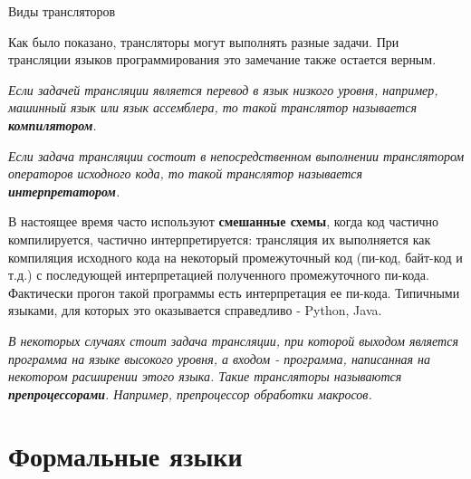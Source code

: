 \documentclass[12pt, pdf, hyperref={unicode},handout]{beamer}
\begin{document}
\begin{frame}{Виды трансляторов}
  \begin{block}

    \small{
      Как было показано, трансляторы могут выполнять разные задачи. При трансляции языков программирования это замечание также остается верным.

      \textit{Если задачей трансляции является перевод в язык низкого уровня, например, машинный язык или язык ассемблера, то такой транслятор называется \textbf{компилятором}.}

      \textit{Если задача трансляции состоит в непосредственном выполнении транслятором операторов исходного кода, то такой транслятор называется \textbf{интерпретатором}.}

      В настоящее время часто используют \textbf{смешанные схемы}, когда код частично компилируется, частично интерпретируется: трансляция их выполняется как компиляция исходного кода на некоторый промежуточный код (пи-код, байт-код и т.д.) с последующей интерпретацией полученного промежуточного пи-кода. Фактически прогон такой программы есть интерпретация ее пи-кода. Типичными языками, для которых это оказывается справедливо - Python, Java.

      \textit{В некоторых случаях стоит задача трансляции, при которой выходом является программа на языке высокого уровня, а входом - программа, написанная на некотором расширении этого языка. Такие трансляторы называются \textbf{препроцессорами}. Например, препроцессор обработки макросов.}
      }

  \end{block}
  
\end{frame}

\section{Формальные языки}
\end{document}
